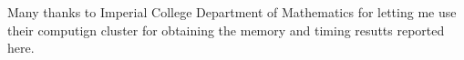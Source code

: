 Many thanks to Imperial College Department of Mathematics for letting
me use their computign cluster for obtaining the memory and timing
resutts reported here.

